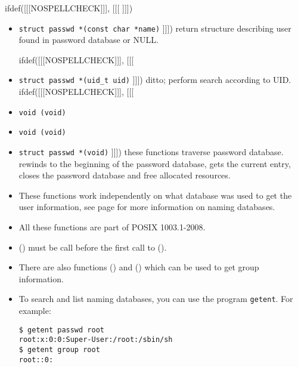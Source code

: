 ifdef([[[NOSPELLCHECK]]], [[[
]]])

\label{GETPW_FUNC}
\begin{slide}
\begin{itemize}
ifdef([[[NOSPELLCHECK]]], [[[
\item \texttt{struct passwd *(const char *name)}
]]])
return structure describing user found in password database or NULL.

ifdef([[[NOSPELLCHECK]]], [[[
\item \texttt{struct passwd *(uid\_t uid)}
]]])
ditto; perform search according to UID.
ifdef([[[NOSPELLCHECK]]], [[[
\item \texttt{void (void)}
\item \texttt{void (void)}
\item \texttt{struct passwd *(void)}
]]])
these functions traverse password database.  rewinds to the
beginning of the password database,  gets the current entry,
 closes the password database and free allocated resources.
\end{itemize}
\end{slide}

\begin{itemize}
\item These functions work independently on what database was used to get the
user information, see page \pageref{name_service_switch} for more information on
naming databases.
\item All these functions are part of POSIX 1003.1-2008.
\item {}() must be call before the first call to
().
\item There are also functions () and () which
can be used to get group information.
\item To search and list naming databases, you can use the program \texttt{getent}.
For example:

\begin{verbatim}
$ getent passwd root
root:x:0:0:Super-User:/root:/sbin/sh
$ getent group root
root::0:
\end{verbatim}
\end{itemize}



